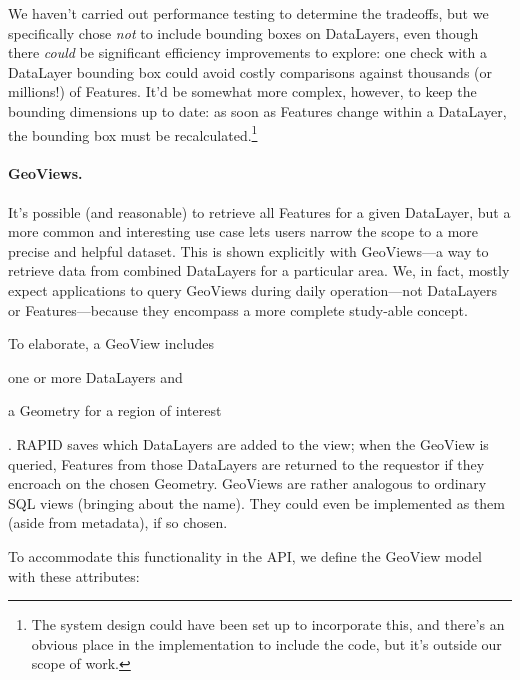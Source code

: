  We haven't carried out performance testing to determine the tradeoffs, but we specifically chose \textit{not} to include bounding boxes on DataLayers, even though there \textit{could} be significant efficiency improvements to explore: one check with a DataLayer bounding box could avoid costly comparisons against thousands (or millions!) of Features. It'd be somewhat more complex, however, to keep the bounding dimensions up to date: as soon as Features change within a DataLayer, the bounding box must be recalculated.\footnote{The system design could have been set up to incorporate this, and there's an obvious place in the implementation to include the code, but it's outside our scope of work.}

\paragraph{GeoViews.}
It's possible (and reasonable) to retrieve all Features for a given DataLayer, but a more common and interesting use case lets users narrow the scope to a more precise and helpful dataset. This is shown explicitly with GeoViews---a way to retrieve data from combined DataLayers for a particular area. We, in fact, mostly expect applications to query GeoViews during daily operation---not DataLayers or Features---because they encompass a more complete study-able concept.

To elaborate, a GeoView includes 
\begin{enumerate*}[label=\itshape\alph*\upshape)]
\item one or more DataLayers and
\item a Geometry for a region of interest
\end{enumerate*}. RAPID saves which DataLayers are added to the view; when the GeoView is queried, Features from those DataLayers are returned to the requestor if they encroach on the chosen Geometry. GeoViews are rather analogous to ordinary SQL views (bringing about the name). They could even be implemented as them (aside from metadata), if so chosen.

To accommodate this functionality in the API, we define the GeoView model with these attributes:

